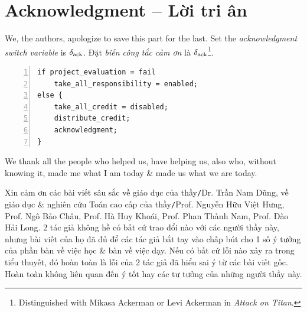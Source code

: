 \documentclass[12pt]{article}
\begin{document}

\appendix


\section{Acknowledgment -- Lời tri ân}
We, the authors, apologize to save this part for the last. Set the {\it acknowledgment switch variable} is $\delta_{\rm ack}$. Đặt {\it biến công tắc cảm ơn} là $\delta_{\rm ack}$\footnote{Distinguished with {\sc Mikasa Ackerman} or {\sc Levi Ackerman} in {\it Attack on Titan}.}.

\begin{Verbatim}[numbers=left,xleftmargin=5mm]
if project_evaluation = fail
    take_all_responsibility = enabled;
else {
    take_all_credit = disabled;
    distribute_credit;
    acknowledgment;
}
\end{Verbatim}
We thank all the people who helped us, have helping us, also who, without knowing it, made me what I am today \& made us what we are today.

Xin cảm ơn các bài viết sâu sắc về giáo dục của thầy{\tt/}Dr. {\sc Trần Nam Dũng}, về giáo dục \& nghiên cứu Toán cao cấp của thầy{\tt/}Prof. {\sc Nguyễn Hữu Việt Hưng}, Prof. {\sc Ngô Bảo Châu}, Prof. {\sc Hà Huy Khoái}, Prof. {\sc Phan Thành Nam}, Prof. {\sc Đào Hải Long}. 2 tác giả không hề có bất cứ trao đổi nào với các người thầy này, nhưng bài viết của họ đã đủ để các tác giả bắt tay vào chấp bút cho 1 số ý tưởng của phần bàn về việc học \& bàn về việc dạy. Nếu có bất cứ lỗi nào xảy ra trong tiểu thuyết, đó hoàn toàn là lỗi của 2 tác giả đã hiểu sai ý từ các bài viết gốc. Hoàn toàn không liên quan đến ý tốt hay các tư tưởng của những người thầy này.
\end{document}
